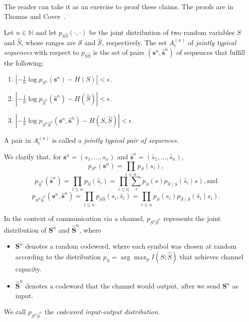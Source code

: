 The reader can take it as an exercise to proof these claims. The proofs are in Thomas and Cover~\cite{infotheory}.

\begin{definition}
Let $n \in \mathbb{N}$ and let $p_{S\hat{S}}(\cdot, \cdot)$ be the joint distribution of two random variables $S$ and $\hat{S}$, whose ranges are $\mathcal{S}$ and $\mathcal{\hat{S}}$, respectively. The set $A^{(n)}_\epsilon$ of \emph{jointly typical sequences} with respect to $p_{S\hat{S}}$ is the set of pairs $(\mathbf{s}^n, \hat{\mathbf{s}}^n)$ of sequences that fulfill the following:
%
\begin{enumerate}
\item $\left|-\frac{1}{n}\log p_{S^n}(\mathbf{s}^n) - H(S)\right| < \epsilon$.
\item $\left|-\frac{1}{n}\log p_{\hat{S}^n}(\hat{\mathbf{s}}^n) - H(\hat{S})\right| < \epsilon$.
\item $\left|-\frac{1}{n}\log p_{S^n\hat{S}^n}(\mathbf{s}^n, \hat{\mathbf{s}}^n) - H(S, \hat{S})\right| < \epsilon$.
\end{enumerate}
% 
A pair in $A^{(n)}_\epsilon$ is called a \emph{jointly typical pair of sequences}.
\end{definition}

We clarify that, for $\mathbf{s}^n = (s_1, \ldots, s_n)$ and $\hat{\mathbf{s}}^n = (\hat{s}_1, \ldots, \hat{s}_n)$,
%
$$p_{S^n}(\mathbf{s}^n) = \prod_{i \leq n} p_S(s_i),$$
%
$$p_{\hat{S}^n}(\hat{\mathbf{s}}^n) = \prod_{i \leq n} p_{\hat{S}}(\hat{s}_i) = \prod_{i \leq n} \sum_{s} p_S(s) p_{\hat{S}\mid S}\left(\hat{s}_i \mid s\right), \text{and}$$
%
$$p_{S^n\hat{S}^n}(\mathbf{s}^n, \hat{\mathbf{s}}^n) = \prod_{i \leq n} p_{S\hat{S}}(s_i, \hat{s}_i) = \prod_{i \leq n} p_S(s_i) p_{\hat{S} \mid S}(\hat{s}_i \mid s_i).$$

In the context of communication via a channel, $p_{S^n\hat{S}^n}$ represents the joint distribution of $\mathbf{S}^n$ and $\hat{\mathbf{S}}^n$, where 
%
\begin{itemize}
\item $\mathbf{S}^n$ denotes a random codeword, where each symbol was chosen at random according to the distribution $p_S = \arg \max_p I(S; \hat{S})$ that achieves channel capacity.
\item $\hat{\mathbf{S}}^n$ denotes a codeword that the channel would output, after we send $\mathbf{S}^n$ as input.
\end{itemize}
%
We call $p_{S^n\hat{S}^n}$ the \emph{codeword input-output distribution}.

